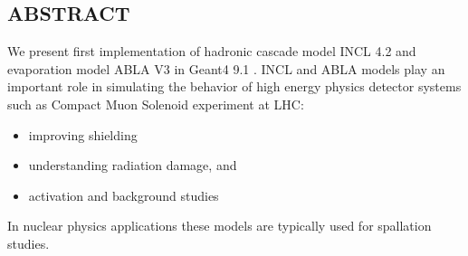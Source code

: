 \documentclass[20pt]{article}
\newenvironment{textbox}
{\begin{lrbox}{\dummybox}\begin{minipage}{0.9\columnwidth}}
{\end{minipage}\end{lrbox}\raisebox{-\depth}{\psshadowbox[framesep=1em,framearc=.1,shadow=true]{\usebox{\dummybox}}}\vspace{0.005\textheight}}
\begin{document}
\begin{center}
\begin{multicols}{3}
\begin{textbox}

\section*{{\Huge {\sf ABSTRACT}}}

{\color{udsect}
We present first implementation \cite{fp} of hadronic cascade model INCL 4.2
\cite{incl} and evaporation model ABLA V3 \cite{abla} in Geant4 9.1 \cite{g4}.
\vskip0.5cm
INCL and ABLA models play an important role in simulating the behavior of high energy physics
detector systems such as Compact Muon Solenoid experiment at LHC:
\begin{itemize}
\item improving shielding
\item understanding radiation damage, and
\item activation and background studies
\end{itemize}
In nuclear physics
applications these models are typically used for spallation studies.

%
%

}

\end{textbox}


\end{multicols}
\end{center}
\end{document}

